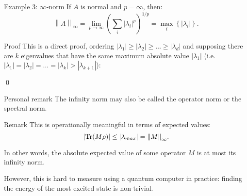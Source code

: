 \documentclass[a4paper]{article}
\begin{document}
\begin{parag}{Example 3: $\infty$-norm}
    If $A$ is normal and $p = \infty$, then: 
    \[\left\|A\right\|_{\infty} = \lim_{p \to \infty} \left(\sum_{i} \left|\lambda_i\right|^p\right)^{1/p}= \max_i \left\{\left|\lambda_i\right|\right\}.\]

    \begin{subparag}{Proof}
        This is a direct proof, ordering $\left|\lambda_1\right| \geq \left|\lambda_2\right| \geq \ldots \geq \left|\lambda_d\right|$ and supposing there are $k$ eigenvalues that have the same maximum absolute value $\left|\lambda_1\right|$ (i.e. $\left|\lambda_1\right| = \left|\lambda_2\right| = \ldots = \left|\lambda_k\right| > \left|\lambda_{k+1}\right|$): 

        \qed
    \end{subparag}

    \begin{subparag}{Personal remark}
        The infinity norm may also be called the operator norm or the spectral norm.
    \end{subparag}

    \begin{subparag}{Remark}
        This is operationally meaningful in terms of expected values: 
        \[\left|\Tr\left(M \rho\right)\right| \leq \left|\lambda_{max}\right| = \left\|M\right\|_{\infty}.\]

        In other words, the absolute expected value of some operator $M$ is at most its infinity norm.

        However, this is hard to measure using a quantum computer in practice: finding the energy of the most excited state is non-trivial.
    \end{subparag}
\end{parag}
\end{document}
